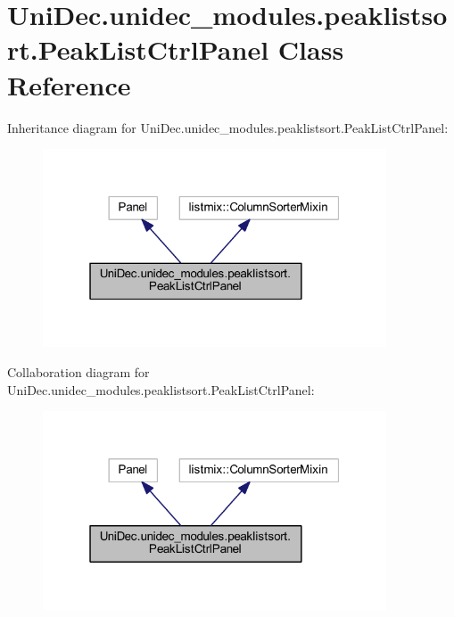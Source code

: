 \hypertarget{class_uni_dec_1_1unidec__modules_1_1peaklistsort_1_1_peak_list_ctrl_panel}{}\section{Uni\+Dec.\+unidec\+\_\+modules.\+peaklistsort.\+Peak\+List\+Ctrl\+Panel Class Reference}
\label{class_uni_dec_1_1unidec__modules_1_1peaklistsort_1_1_peak_list_ctrl_panel}


Inheritance diagram for Uni\+Dec.\+unidec\+\_\+modules.\+peaklistsort.\+Peak\+List\+Ctrl\+Panel\+:\nopagebreak
\begin{figure}[H]
\begin{center}
\leavevmode
\includegraphics[width=289pt]{class_uni_dec_1_1unidec__modules_1_1peaklistsort_1_1_peak_list_ctrl_panel__inherit__graph}
\end{center}
\end{figure}


Collaboration diagram for Uni\+Dec.\+unidec\+\_\+modules.\+peaklistsort.\+Peak\+List\+Ctrl\+Panel\+:\nopagebreak
\begin{figure}[H]
\begin{center}
\leavevmode
\includegraphics[width=289pt]{class_uni_dec_1_1unidec__modules_1_1peaklistsort_1_1_peak_list_ctrl_panel__coll__graph}
\end{center}
\end{figure}
